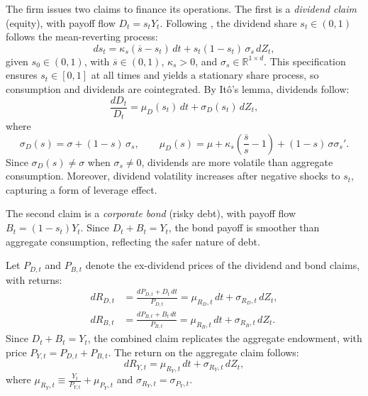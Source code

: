 \documentclass[12pt,english]{article}
\begin{document}
The firm issues two claims to finance its operations. The first is a \emph{dividend claim} (equity), with payoff flow $D_t = s_t Y_t$. Following \citet{MenzlySantosVeronesi2004}, the dividend share $s_t \in (0,1)$ follows the mean-reverting process:
\begin{equation}\label{eq:s_process}
    ds_t = \kappa_s(\overline{s} - s_t)\,dt + s_t(1-s_t)\,\sigma_s\,dZ_t,
\end{equation}
given $s_0 \in (0,1)$, with $\overline{s} \in (0,1)$, $\kappa_s > 0$, and $\sigma_s \in \mathbb{R}^{1\times d}$. This specification ensures $s_t \in [0,1]$ at all times and yields a stationary share process, so consumption and dividends are cointegrated. By It\^{o}'s lemma, dividends follow:
\begin{equation}\label{eq:D_dynamics}
    \frac{dD_t}{D_t} = \mu_D(s_t)\,dt + \sigma_D(s_t)\,dZ_t,
\end{equation}
where
\begin{equation}\label{eq:D_vol}
    \sigma_D(s) = \sigma + (1-s)\,\sigma_s, \qquad 
    \mu_D(s) = \mu + \kappa_s\!\left(\frac{\overline{s}}{s}-1\right) + (1-s)\,\sigma\sigma_s'.
\end{equation}
Since $\sigma_D(s) \neq \sigma$ when $\sigma_s \neq 0$, dividends are more volatile than aggregate consumption. Moreover, dividend volatility increases after negative shocks to $s_t$, capturing a form of leverage effect.

The second claim is a \emph{corporate bond} (risky debt), with payoff flow $B_t = (1-s_t)Y_t$. Since $D_t + B_t = Y_t$, the bond payoff is smoother than aggregate consumption, reflecting the safer nature of debt.

Let $P_{D,t}$ and $P_{B,t}$ denote the ex-dividend prices of the dividend and bond claims, with returns:
\begin{align}
    dR_{D,t} &= \frac{dP_{D,t}+D_t\,dt}{P_{D,t}}
    = \mu_{R_D,t}\,dt+\sigma_{R_D,t}\,dZ_t, \label{eq:RD_def}\\
    dR_{B,t} &= \frac{dP_{B,t}+B_t\,dt}{P_{B,t}}
    = \mu_{R_B,t}\,dt+\sigma_{R_B,t}\,dZ_t. \label{eq:RB_def}
\end{align}
Since $D_t+B_t=Y_t$, the combined claim replicates the aggregate endowment, with price $P_{Y,t} = P_{D,t}+P_{B,t}$. The return on the aggregate claim follows:
\begin{equation}\label{eq:risky-asset-ret}
    dR_{Y,t} = \mu_{R_Y,t}\,dt + \sigma_{R_Y,t}\,dZ_t,
\end{equation}
where $\mu_{R_Y,t} \equiv \frac{Y_t}{P_{Y,t}} + \mu_{P_Y,t}$ and $\sigma_{R_Y,t} = \sigma_{P_Y,t}$.
\end{document}

